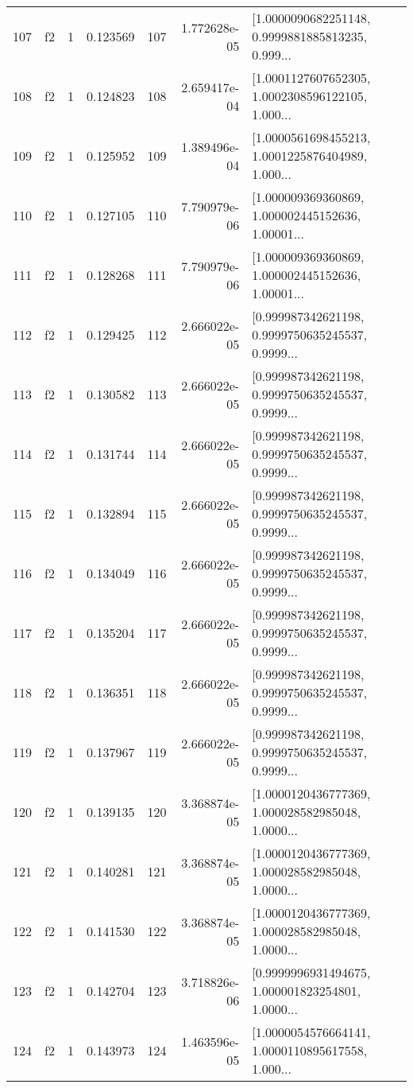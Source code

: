 \begin{tabular}{lllrlrl}
107 &  f2 &   1 &  0.123569 &  107 &  1.772628e-05 &  [1.0000090682251148, 0.9999881885813235, 0.999... \\
108 &  f2 &   1 &  0.124823 &  108 &  2.659417e-04 &  [1.0001127607652305, 1.0002308596122105, 1.000... \\
109 &  f2 &   1 &  0.125952 &  109 &  1.389496e-04 &  [1.0000561698455213, 1.0001225876404989, 1.000... \\
110 &  f2 &   1 &  0.127105 &  110 &  7.790979e-06 &  [1.000009369360869, 1.000002445152636, 1.00001... \\
111 &  f2 &   1 &  0.128268 &  111 &  7.790979e-06 &  [1.000009369360869, 1.000002445152636, 1.00001... \\
112 &  f2 &   1 &  0.129425 &  112 &  2.666022e-05 &  [0.999987342621198, 0.9999750635245537, 0.9999... \\
113 &  f2 &   1 &  0.130582 &  113 &  2.666022e-05 &  [0.999987342621198, 0.9999750635245537, 0.9999... \\
114 &  f2 &   1 &  0.131744 &  114 &  2.666022e-05 &  [0.999987342621198, 0.9999750635245537, 0.9999... \\
115 &  f2 &   1 &  0.132894 &  115 &  2.666022e-05 &  [0.999987342621198, 0.9999750635245537, 0.9999... \\
116 &  f2 &   1 &  0.134049 &  116 &  2.666022e-05 &  [0.999987342621198, 0.9999750635245537, 0.9999... \\
117 &  f2 &   1 &  0.135204 &  117 &  2.666022e-05 &  [0.999987342621198, 0.9999750635245537, 0.9999... \\
118 &  f2 &   1 &  0.136351 &  118 &  2.666022e-05 &  [0.999987342621198, 0.9999750635245537, 0.9999... \\
119 &  f2 &   1 &  0.137967 &  119 &  2.666022e-05 &  [0.999987342621198, 0.9999750635245537, 0.9999... \\
120 &  f2 &   1 &  0.139135 &  120 &  3.368874e-05 &  [1.0000120436777369, 1.000028582985048, 1.0000... \\
121 &  f2 &   1 &  0.140281 &  121 &  3.368874e-05 &  [1.0000120436777369, 1.000028582985048, 1.0000... \\
122 &  f2 &   1 &  0.141530 &  122 &  3.368874e-05 &  [1.0000120436777369, 1.000028582985048, 1.0000... \\
123 &  f2 &   1 &  0.142704 &  123 &  3.718826e-06 &  [0.9999996931494675, 1.000001823254801, 1.0000... \\
124 &  f2 &   1 &  0.143973 &  124 &  1.463596e-05 &  [1.0000054576664141, 1.0000110895617558, 1.000... \\

\end{tabular}
